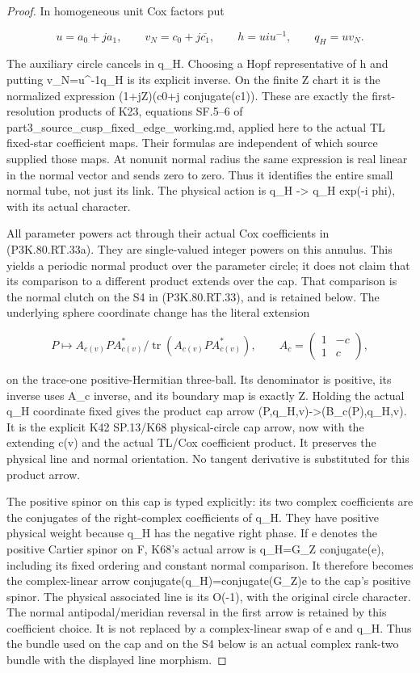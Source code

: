 \begin{proof}
In homogeneous unit Cox factors put

\[
 u=a_0+j a_1,\qquad v_N=c_0+j\overline{c_1},\qquad
 h=u i u^{-1},\qquad q_H=u v_N.                    \tag{P3K.80.RT.33a}
\]

The auxiliary circle cancels in q\_H. Choosing a Hopf representative
of h and putting v\_N=u\textasciicircum{}{-1}q\_H is its explicit inverse. On the
finite Z chart it is the normalized expression
(1+jZ)(c0+j conjugate(c1)). These are exactly the first-resolution
products of K23, equations SF.5--6 of
part3\_source\_cusp\_fixed\_edge\_working.md, applied here to the actual
TL fixed-star coefficient maps. Their formulas are independent of
which source supplied those maps. At nonunit normal radius the
same expression is real linear in the normal vector and sends
zero to zero. Thus it identifies the entire small normal tube,
not just its link. The physical action is
q\_H -> q\_H exp(-i phi), with its actual character.

All parameter powers act through their actual Cox coefficients
in (P3K.80.RT.33a). They are single-valued integer powers on this annulus.
This yields a periodic normal product over the parameter circle;
it does not claim that its comparison to a different product
extends over the cap. That comparison is the normal clutch on
the S4 in (P3K.80.RT.33), and is retained below. The underlying sphere
coordinate change has the literal extension

\[
 P\longmapsto A_{c(v)}P A_{c(v)}^*/
                    \operatorname{tr}(A_{c(v)}P A_{c(v)}^*),
 \qquad A_c=\begin{pmatrix}1&-c\\1&c\end{pmatrix},  \tag{P3K.80.RT.33b}
\]

on the trace-one positive-Hermitian three-ball. Its denominator
is positive, its inverse uses A\_c inverse, and its boundary map
is exactly Z. Holding the actual q\_H coordinate fixed gives the
product cap arrow (P,q\_H,v)->(B\_c(P),q\_H,v). It is the explicit
K42 SP.13/K68 physical-circle cap arrow, now with the extending
c(v) and the actual TL/Cox coefficient product. It preserves
the physical line and normal orientation. No tangent derivative
is substituted for this product arrow.

The positive spinor on this cap is typed explicitly: its two
complex coefficients are the conjugates of the right-complex
coefficients of q\_H. They have positive physical weight because
q\_H has the negative right phase. If e denotes the positive
Cartier spinor on F, K68's actual arrow is q\_H=G\_Z conjugate(e),
including its fixed ordering and constant normal comparison.
It therefore becomes the complex-linear arrow
conjugate(q\_H)=conjugate(G\_Z)e to the cap's positive spinor.
The physical associated line is its O(-1), with the original
circle character. The normal antipodal/meridian reversal in
the first arrow is retained by this coefficient choice. It is
not replaced by a complex-linear swap of e and q\_H. Thus the
bundle used on the cap and on the S4 below is an actual complex
rank-two bundle with the displayed line morphism.


\end{proof}
